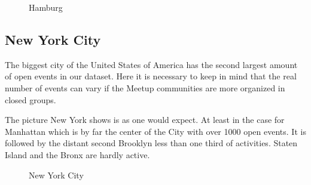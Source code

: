 \begin{figure}[!htp]
	\hfill
	\caption{Hamburg}
\end{figure}

\subsection*{New York City}

The biggest city of the United States of America has the second largest amount of open events in our dataset. Here it is necessary to keep in mind that the real number of events can vary if the Meetup communities are more organized in closed groups. 

The picture New York shows is as one would expect. At least in the case for Manhattan which is by far the center of the City with over 1000 open events. It is followed by the distant second Brooklyn less than one third of activities. Staten Island and the Bronx are hardly active. 

\begin{figure}[!htp]
	\hfill
	\caption{New York City}\label{fig:newyorkmap}
\end{figure}

